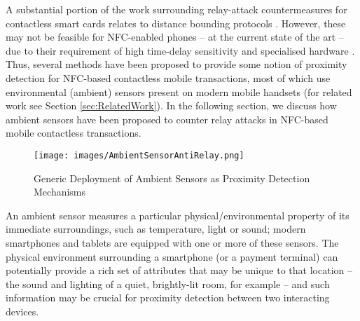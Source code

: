 \documentclass[runningheads,a4paper]{llncs}
\begin{document}
A substantial portion of the work surrounding relay-attack countermeasures for contactless smart cards relates to distance bounding protocols \cite{rasmussen2010realization,DrimerM07,Francillon11,Hancke:2008:ATD:1352533.1352566,Cremers2012,boureanu2014towards}.  However, these may not be feasible for NFC-enabled phones -- at the current state of the art -- due to their requirement of high time-delay sensitivity and specialised hardware \cite{Coskun2013,Halevi2012}.  Thus, several methods have been proposed to provide some notion of proximity detection for NFC-based contactless mobile transactions, most of which use environmental (ambient) sensors present on modern mobile handsets (for related work see Section \ref{sec:RelatedWork}).  In the following section, we discuss how ambient sensors have been proposed to counter relay attacks in NFC-based mobile contactless transactions. 

\begin{figure}[ht]
	\centering
		\texttt{[image: images/AmbientSensorAntiRelay.png]}
	\caption{Generic Deployment of Ambient Sensors as Proximity Detection Mechanisms}
	\label{fig:AmbientSensorDeploymentOverview}
\end{figure}

An ambient sensor measures a particular physical/environmental property of its immediate surroundings, such as temperature, light or sound; modern smartphones and tablets are equipped with one or more of these sensors. The physical environment surrounding a smartphone (or a payment terminal) can potentially provide a rich set of attributes that may be unique to that location -- the sound and lighting of a quiet, brightly-lit room, for example -- and such information may be crucial for proximity detection between two interacting devices.  
\end{document}
